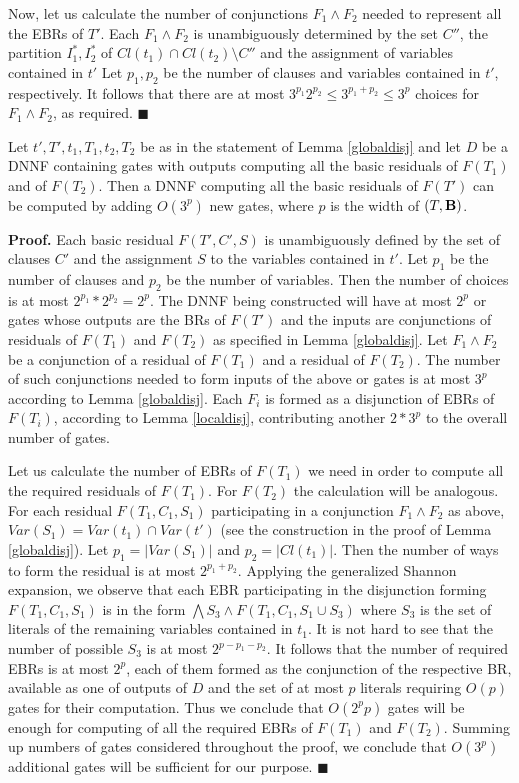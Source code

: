 \documentclass{llncs}
\begin{document}
Now, let us calculate the number of conjunctions $F_1 \wedge F_2$ needed to represent all the EBRs of $T'$.
Each $F_1 \wedge F_2$ is unambiguously determined by the set
$C''$, the partition $I^*_1,I^*_2$ of $Cl(t_1) \cap Cl(t_2) \setminus C''$ and the assignment of variables
contained in $t'$ Let $p_1,p_2$ be the number of clauses and variables contained in $t'$, respectively. It follows that there
are at most $3^{p_1}2^{p_2} \leq 3^{p_1+p_2} \leq 3^p$ choices for $F_1 \wedge F_2$, as required. 
$\blacksquare$


\begin{lemma} \label{layerdnnf}
Let $t',T',t_1,T_1,t_2,T_2$ be as in the statement of Lemma \ref{globaldisj} and let $D$ be a DNNF  containing gates with outputs computing all the basic residuals of $F(T_1)$ and of $F(T_2)$.
Then a DNNF computing all the basic residuals of $F(T')$ can be computed by adding $O(3^p)$ new
gates, where $p$ is the width of $(T,{\bf B})$.
\end{lemma}

{\bf Proof.}
Each basic residual $F(T',C',S)$ is unambiguously defined by the set of clauses $C'$
and  the assignment $S$ to the variables contained in $t'$. Let $p_1$ be the number of clauses
and $p_2$ be the number of variables. Then the number of choices is at most $2^{p_1}*2^{p_2}=2^p$.
The DNNF being constructed will have at most $2^p$ {\sc or} gates whose outputs are the BRs of $F(T')$ 
and the inputs are conjunctions of residuals of $F(T_1)$ and $F(T_2)$ as specified in
Lemma \ref{globaldisj}.  
Let $F_1 \wedge F_2$ be a conjunction of a residual of $F(T_1)$ and a residual of $F(T_2)$. The number 
of such conjunctions needed to form inputs of the above {\sc or} gates is at most $3^p$ according to 
Lemma \ref{globaldisj}. Each $F_i$ is formed as a disjunction of EBRs of $F(T_i)$, according to Lemma 
\ref{localdisj}, contributing another $2*3^p$ to the overall number of gates.
 
Let us calculate the number of EBRs of $F(T_1)$ we need in order to compute
all the required residuals of $F(T_1)$. For $F(T_2)$ the calculation will be analogous.
For each residual $F(T_1,C_1,S_1)$ participating in a conjunction $F_1 \wedge F_2$ as above, 
$Var(S_1)=Var(t_1)  \cap Var(t')$ (see the construction
in the proof of Lemma \ref{globaldisj}). Let $p_1=|Var(S_1)|$ and $p_2=|Cl(t_1)|$.
Then the number of ways to form the residual is at most $2^{p_1+p_2}$. 
Applying the generalized Shannon expansion, we observe that each EBR
participating in the disjunction forming $F(T_1,C_1,S_1)$ is in the form
$\bigwedge S_3 \wedge F(T_1,C_1,S_1 \cup S_3)$ where $S_3$ is the set of literals of the remaining 
variables contained in $t_1$. It is not hard to see that the number of possible $S_3$
is at most $2^{p-p_1-p_2}$. It follows that the number of required EBRs is at most $2^p$, each of them
formed as the conjunction of the respective BR, available as one of outputs of $D$ and the set of at most $p$
literals requiring $O(p)$ gates for their computation. Thus we conclude that $O(2^pp)$ gates will be enough for computing  
of all the required EBRs of $F(T_1)$ and $F(T_2)$.
Summing up numbers of gates considered throughout the proof, we conclude
that $O(3^p)$ additional gates will be sufficient for our purpose. $\blacksquare$
\end{document}
